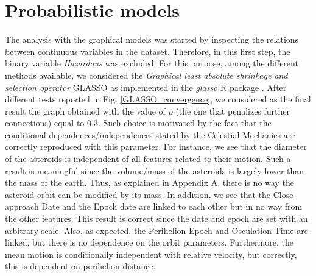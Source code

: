 \documentclass[12pt,%
               a4paper,%
               oneside,openany,%
               titlepage,%
               headinclude,footinclude,%
               BCOR5mm,%
               cleardoublepage=empty,%
               tablecaptionabove,%
               floatperchapter,
               ]{scrreprt}                 %
\begin{document}
\pagebreak

\section{Probabilistic models} The analysis with the graphical models was started by inspecting the relations between continuous variables in the dataset. Therefore, in this first step, the binary variable \textit{Hazardous} was excluded. For this purpose, among the different methods available, we considered the \textit{Graphical least absolute shrinkage and selection operator} GLASSO as implemented in the \textit{glasso} R package \cite{friedman2008sparse,glasso}. After different tests reported in Fig. \ref{GLASSO_convergence}, we considered as the final result the graph obtained with the value of $\rho$ (the one that penalizes further connections) equal to $0.3$. Such choice is motivated by the fact that the conditional dependences/independences stated by the Celestial Mechanics are correctly reproduced with this parameter. For instance, we see that the diameter of the asteroids is independent of all features related to their motion. Such a result is meaningful since the volume/mass of the asteroids is largely lower than the mass of the earth.  Thus, as explained in Appendix A, there is no way the asteroid orbit can be modified by its mass. In addition, we see that the Close approach Date and the Epoch date are linked to each other but in no way from the other features. This result is correct since the date and epoch are set with an arbitrary scale. Also, as expected, the Perihelion Epoch and Osculation Time are linked, but there is no dependence on the orbit parameters. Furthermore, the mean motion is conditionally independent with relative velocity, but correctly, this is dependent on perihelion distance.
\end{document}
